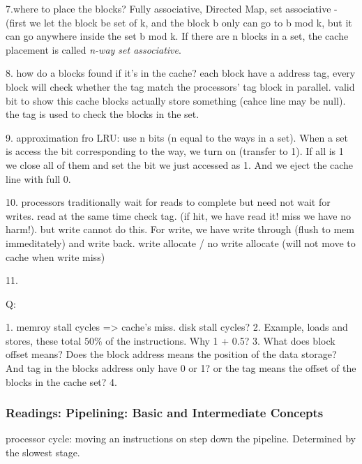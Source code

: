 \documentclass[UTF8]{article}
\begin{document}
7.where to place the blocks? Fully associative, Directed Map, set associative - (first we let the block be set of k, and the block b only can go to b mod k, but it can go anywhere inside the set b mod k. If there are n blocks in a set, the cache placement is called \emph{n-way set associative}.

8. how do a blocks found if it's in the cache? each block have a address tag, every block will check whether the tag match the processors' tag block in parallel. valid bit to show this cache blocks actually store something (cahce line may be null). the tag is used to check the blocks in the set. 

9. approximation fro LRU: use n bits (n equal to the ways in a set). When a set is access the bit corresponding to the way, we turn on (transfer to 1). If all is 1 we close all of them and set the bit we just accessed as 1. And we eject the cache line with full 0.

10. processors traditionally wait for reads to complete but need not wait for writes. read at the same time check tag. (if hit, we have read it! miss we have no harm!). but write cannot do this. For write, we have write through (flush to mem immeditately) and write back. write allocate / no write allocate (will not move to cache when write miss)

11. 

Q:

1. memroy stall cycles => cache's miss. disk stall cycles?
2. Example, loads and stores, these total $50\%$ of the instructions. Why 1 + 0.5?
3. What does block offset means? Does the block address means the position of the data storage? And tag in the blocks address only have 0 or 1? or the tag means the offset of the blocks in the cache set?
4. 

\subsubsection{Readings: Pipelining: Basic and Intermediate Concepts}

processor cycle: moving an instructions on step down the pipeline. Determined by the slowest stage.
\end{document}
